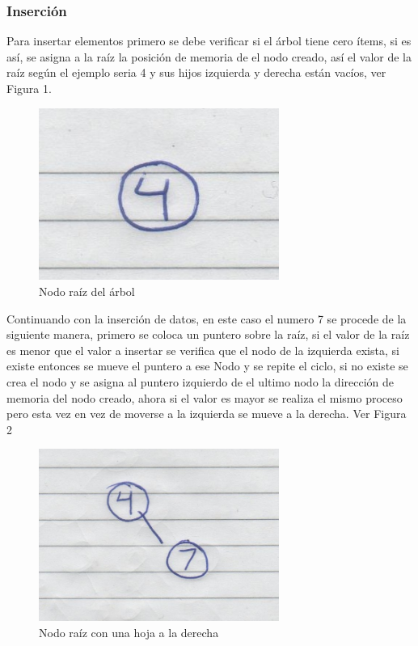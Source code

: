 \subsubsection{Inserción}
Para insertar elementos primero se debe verificar si el árbol tiene cero ítems, si es así, se asigna a la raíz la posición de memoria de el nodo creado,
así el valor de la raíz según el ejemplo seria 4 y sus hijos izquierda y derecha están vacíos, ver Figura 1.
\begin{figure}[H]
	\centering
	\includegraphics[width=0.7\textwidth]{./images/imagen1.jpg}
	\caption{Nodo raíz del árbol}
\end{figure} 
Continuando con la inserción de datos, en este caso el numero 7 se procede de la siguiente manera, primero se coloca un puntero sobre la raíz, si 
el valor de la raíz es menor que el valor a insertar se verifica que el nodo de la izquierda exista, si existe entonces se mueve el puntero a ese Nodo
y se repite el ciclo, si no existe se crea el nodo y se asigna al puntero izquierdo de el ultimo nodo la dirección de memoria del nodo creado, ahora
si el valor es mayor se realiza el mismo proceso pero esta vez en vez de moverse a la izquierda se mueve a la derecha. Ver Figura 2
\begin{figure}[H]
	\centering
	\includegraphics[width=0.7\textwidth]{./images/imagen2.jpg}
	\caption{Nodo raíz con una hoja a la derecha}
\end{figure} 
